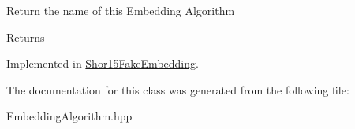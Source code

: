 Return the name of this Embedding Algorithm \begin{DoxyReturn}{Returns}

\end{DoxyReturn}


Implemented in \hyperlink{a01153_a367d7fb040def889895303a600021675}{Shor15\+Fake\+Embedding}.



The documentation for this class was generated from the following file\+:\begin{DoxyCompactItemize}
\item 
Embedding\+Algorithm.\+hpp\end{DoxyCompactItemize}
